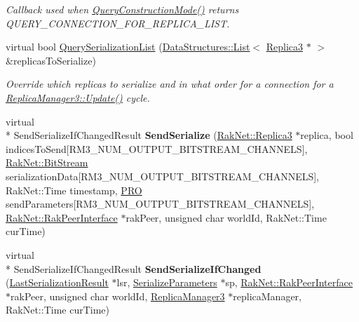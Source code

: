 \begin{DoxyCompactItemize}
\begin{DoxyCompactList}\small\item\em Callback used when \hyperlink{class_rak_net_1_1_connection___r_m3_a918f5c8d69e2ede6c9469fd9ade96d32}{Query\-Construction\-Mode()} returns Q\-U\-E\-R\-Y\-\_\-\-C\-O\-N\-N\-E\-C\-T\-I\-O\-N\-\_\-\-F\-O\-R\-\_\-\-R\-E\-P\-L\-I\-C\-A\-\_\-\-L\-I\-S\-T. \end{DoxyCompactList}\item 
virtual bool \hyperlink{class_rak_net_1_1_connection___r_m3_a9dc79ed7a9252f7ae358b62ec1fbb195}{Query\-Serialization\-List} (\hyperlink{class_data_structures_1_1_list}{Data\-Structures\-::\-List}$<$ \hyperlink{class_rak_net_1_1_replica3}{Replica3} $\ast$ $>$ \&replicas\-To\-Serialize)
\begin{DoxyCompactList}\small\item\em Override which replicas to serialize and in what order for a connection for a \hyperlink{class_rak_net_1_1_replica_manager3_a8aa2fdb5b20aeeab74b037bc1632c9e9}{Replica\-Manager3\-::\-Update()} cycle. \end{DoxyCompactList}\item 
\hypertarget{class_rak_net_1_1_connection___r_m3_a85259cebcc1d226d501a9b83362e9369}{virtual \\*
Send\-Serialize\-If\-Changed\-Result {\bfseries Send\-Serialize} (\hyperlink{class_rak_net_1_1_replica3}{Rak\-Net\-::\-Replica3} $\ast$replica, bool indices\-To\-Send\mbox{[}R\-M3\-\_\-\-N\-U\-M\-\_\-\-O\-U\-T\-P\-U\-T\-\_\-\-B\-I\-T\-S\-T\-R\-E\-A\-M\-\_\-\-C\-H\-A\-N\-N\-E\-L\-S\mbox{]}, \hyperlink{class_rak_net_1_1_bit_stream}{Rak\-Net\-::\-Bit\-Stream} serialization\-Data\mbox{[}R\-M3\-\_\-\-N\-U\-M\-\_\-\-O\-U\-T\-P\-U\-T\-\_\-\-B\-I\-T\-S\-T\-R\-E\-A\-M\-\_\-\-C\-H\-A\-N\-N\-E\-L\-S\mbox{]}, Rak\-Net\-::\-Time timestamp, \hyperlink{struct_rak_net_1_1_p_r_o}{P\-R\-O} send\-Parameters\mbox{[}R\-M3\-\_\-\-N\-U\-M\-\_\-\-O\-U\-T\-P\-U\-T\-\_\-\-B\-I\-T\-S\-T\-R\-E\-A\-M\-\_\-\-C\-H\-A\-N\-N\-E\-L\-S\mbox{]}, \hyperlink{class_rak_net_1_1_rak_peer_interface}{Rak\-Net\-::\-Rak\-Peer\-Interface} $\ast$rak\-Peer, unsigned char world\-Id, Rak\-Net\-::\-Time cur\-Time)}\label{class_rak_net_1_1_connection___r_m3_a85259cebcc1d226d501a9b83362e9369}

\item 
\hypertarget{class_rak_net_1_1_connection___r_m3_a4034a140c915cf434e9aaca583dced5c}{virtual \\*
Send\-Serialize\-If\-Changed\-Result {\bfseries Send\-Serialize\-If\-Changed} (\hyperlink{struct_rak_net_1_1_last_serialization_result}{Last\-Serialization\-Result} $\ast$lsr, \hyperlink{struct_rak_net_1_1_serialize_parameters}{Serialize\-Parameters} $\ast$sp, \hyperlink{class_rak_net_1_1_rak_peer_interface}{Rak\-Net\-::\-Rak\-Peer\-Interface} $\ast$rak\-Peer, unsigned char world\-Id, \hyperlink{class_rak_net_1_1_replica_manager3}{Replica\-Manager3} $\ast$replica\-Manager, Rak\-Net\-::\-Time cur\-Time)}\label{class_rak_net_1_1_connection___r_m3_a4034a140c915cf434e9aaca583dced5c}


\end{DoxyCompactItemize}
